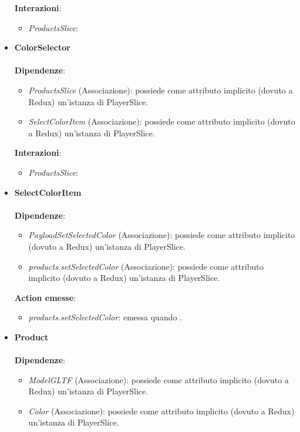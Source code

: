 \begin{itemize}
		\textbf{Interazioni}:
		\begin{itemize}
			\item \textit{ProductsSlice}:
		\end{itemize}
		\item \textbf{ColorSelector}
		\\\\
		\textbf{Dipendenze}:
		\begin{itemize}
			\item \textit{ProductsSlice} (Associazione): possiede come attributo implicito (dovuto a Redux) un'istanza di PlayerSlice.
			\item \textit{SelectColorItem} (Associazione): possiede come attributo implicito (dovuto a Redux) un'istanza di PlayerSlice.
		\end{itemize}
		\textbf{Interazioni}:
		\begin{itemize}
			\item \textit{ProductsSlice}:
		\end{itemize}
		\item \textbf{SelectColorItem}
		\\\\
		\textbf{Dipendenze}:
		\begin{itemize}
			\item \textit{PayloadSetSelectedColor} (Associazione): possiede come attributo implicito (dovuto a Redux) un'istanza di PlayerSlice.
			\item \textit{products.setSelectedColor} (Associazione): possiede come attributo implicito (dovuto a Redux) un'istanza di PlayerSlice.
		\end{itemize}
		\textbf{Action emesse}:
		\begin{itemize}
			\item \textit{products.setSelectedColor}: emessa quando .
		\end{itemize}
		\item \textbf{Product}
		\\\\
		\textbf{Dipendenze}:
		\begin{itemize}
			\item \textit{ModelGLTF} (Associazione): possiede come attributo implicito (dovuto a Redux) un'istanza di PlayerSlice.
			\item \textit{Color} (Associazione): possiede come attributo implicito (dovuto a Redux) un'istanza di PlayerSlice.
		\end{itemize}
\end{itemize}

















